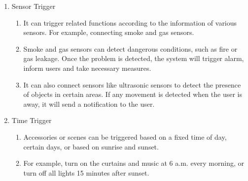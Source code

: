 \begin{enumerate}[label=\arabic*.]
\begin{enumerate}[label*={\arabic*.}]
\begin{enumerate}[label*={\alph*.},ref=\theenumi.\arabic*]
                              \item {\large{Sensor Trigger}}\\
                                    \begin{enumerate}[label*={\arabic*.},ref=\theenumi.\arabic*]
                                          \setlength{\itemindent}{0.5cm}
                                          \item It can trigger related functions according to the information of various sensors. For example, connecting smoke and gas sensors.\\
                                          \item Smoke and gas sensors can detect dangerous conditions, such as fire or gas leakage. Once the problem is detected, the system will trigger alarm, inform users and take necessary measures.\\
                                          \item It can also connect sensors like ultrasonic sensors to detect the presence of objects in certain areas. If any movement is detected when the user is away, it will send a notification to the user.\\
                                    \end{enumerate}

                              \item {\large{Time Trigger}}\\
                                    \begin{enumerate}[label*={\arabic*.},ref=\theenumi.\arabic*]
                                          \setlength{\itemindent}{0.5cm}
                                          \item Accessories or scenes can be triggered based on a fixed time of day, certain days, or based on sunrise and sunset. \\
                                          \item For example, turn on the curtains and music at 6 a.m. every morning, or turn off all lights 15 minutes after sunset.\\
                                    \end{enumerate}


\end{enumerate}
\end{enumerate}
\end{enumerate}
